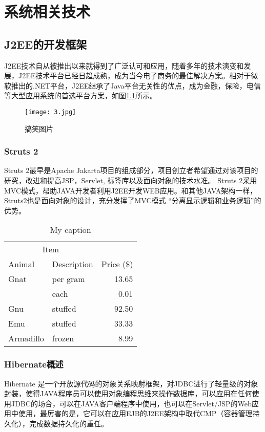 ﻿\chapter{系统相关技术}
\section{J2EE的开发框架}
J2EE技术自从被推出以来就得到了广泛认可和应用，随着多年的技术演变和发展，J2EE技术平台已经日趋成熟，成为当今电子商务的最佳解决方案。相对于微软推出的.NET平台，J2EE继承了Java平台无关性的优点，成为金融，保险，电信等大型应用系统的首选平台方案，如图\ref{2bro}所示。
\begin{figure}[htbp]
  \centering
  \texttt{[image: 3.jpg]}\\
  \caption{搞笑图片}\label{2bro}
\end{figure}
\subsection{Struts 2}
Struts 2最早是Apache Jakarta项目的组成部分，项目创立者希望通过对该项目的研究，改进和提高JSP，Servlet, 标签库以及面向对象的技术水准。 Struts 2采用MVC模式，帮助JAVA开发者利用J2EE开发WEB应用。和其他JAVA架构一样，Struts2也是面向对象的设计，充分发挥了MVC模式 “分离显示逻辑和业务逻辑”的优势。

\renewcommand\arraystretch{1.2}
\begin{table}[htb]
\centering
\caption{My caption}
\label{my-label}
\begin{tabular}{llr}
\hline
\multicolumn{2}{c}{Item} &            \\ \cline{1-2}
Animal     & Description & Price (\$) \\ \hline
Gnat       & per gram    & 13.65      \\
           & each        & 0.01       \\
Gnu        & stuffed     & 92.50      \\
Emu        & stuffed     & 33.33      \\
Armadillo  & frozen      & 8.99       \\ \hline
\end{tabular}
\end{table}

\FloatBarrier
\subsection{Hibernate概述}
Hibernate 是一个开放源代码的对象关系映射框架，对JDBC进行了轻量级的对象封装，使得JAVA程序员可以使用对象编程思维来操作数据库，可以应用在任何使用JDBC的场合，可以在JAVA客户端程序中使用，也可以在Servlet/JSP的Web应用中使用，最厉害的是，它可以在应用EJB的J2EE架构中取代CMP（容器管理持久化），完成数据持久化的重任。


